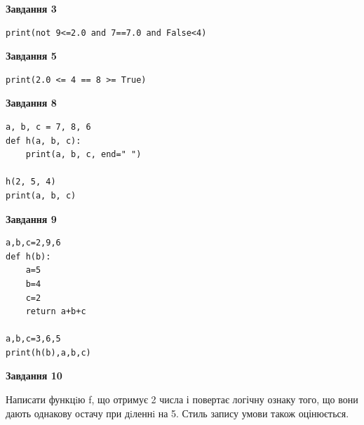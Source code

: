 \documentclass[12pt, ukrainian]{article}
\begin{document}
{\begin {large}
\begin{minipage}[t]{7.5cm}
\end{minipage}
\vline \hspace{6mm}
\begin{minipage}[t]{10.5cm}

\begin{center}
\textbf{Завдання 3}
\end{center}

\begin{verbatim}
print(not 9<=2.0 and 7==7.0 and False<4)
\end{verbatim}



\begin{center}
\textbf{Завдання 5}
\end{center}

\begin{verbatim}
print(2.0 <= 4 == 8 >= True)
\end{verbatim}



\begin{center}
\textbf{Завдання 8}
\end{center}

\begin{verbatim}
a, b, c = 7, 8, 6
def h(a, b, c):
    print(a, b, c, end=" ")

h(2, 5, 4)
print(a, b, c)
\end{verbatim}



\begin{center}
\textbf{Завдання 9}
\end{center}

\begin{verbatim}
a,b,c=2,9,6
def h(b):
    a=5
    b=4
    c=2
    return a+b+c

a,b,c=3,6,5
print(h(b),a,b,c)
\end{verbatim}



\begin{center}
\textbf{Завдання 10}
\end{center}

Написати функцiю f, що отримує 2 числа і повертає логічну ознаку того, що вони дають однакову остачу при дiленнi на 5. Стиль запису умови також оцінюється.\par

\end{minipage}

\end {large}}
\newpage
\end{document}
